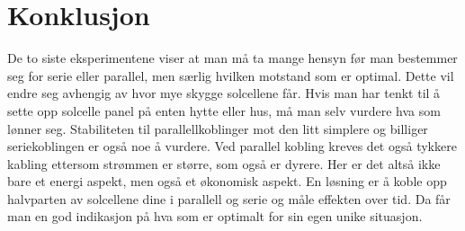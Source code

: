 \documentclass[reprint,norsk,notitlepage]{revtex4-2}
\begin{document}
\section{Konklusjon} \label{sec: conclusion}
De to siste eksperimentene viser at man må ta mange hensyn før man bestemmer seg for serie eller parallel, men særlig hvilken motstand som er optimal. Dette vil endre seg avhengig av hvor mye skygge solcellene får. Hvis man har tenkt til å sette opp solcelle panel på enten hytte eller hus, må man selv vurdere hva som lønner seg. Stabiliteten til parallellkoblinger mot den litt simplere og billiger seriekoblingen er også noe å vurdere. Ved parallel kobling kreves det også tykkere kabling ettersom strømmen er større, som også er dyrere. Her er det altså ikke bare et energi aspekt, men også et økonomisk aspekt. En løsning er å koble opp halvparten av solcellene dine i parallell og serie og måle effekten over tid. Da får man en god indikasjon på hva som er optimalt for sin egen unike situasjon. 
\end{document}
